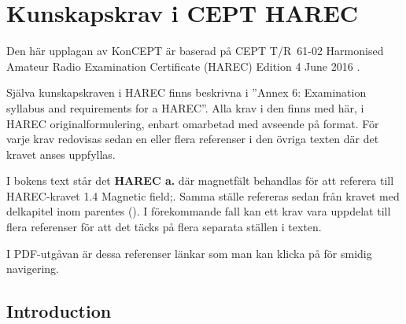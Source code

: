 \chapter{Kunskapskrav i CEPT HAREC}
\label{CEPT HAREC}

\noindent
Den här upplagan av KonCEPT är baserad på CEPT T/R~61-02 Harmonised Amateur
Radio Examination Certificate (HAREC) Edition 4 June 2016 \cite{TR6102}.

Själva kunskapskraven i HAREC finns beskrivna i
''Annex 6: Examination syllabus and requirements for a HAREC''.
Alla krav i den finns med här, i HAREC originalformulering, enbart omarbetad
med avseende på format.
För varje krav redovisas sedan en eller flera referenser i den övriga texten
där det kravet anses uppfyllas.

I bokens text står det \textbf{HAREC a.} där magnetfält
behandlas för att referera till HAREC-kravet 1.4 Magnetic field;.
Samma ställe refereras sedan från kravet med delkapitel inom parentes
().
I förekommande fall kan ett krav vara uppdelat till flera referenser för att
det täcks på flera separata ställen i texten.

I PDF-utgåvan är dessa referenser länkar som man kan klicka på för smidig
navigering.

\section{Introduction}

\makeatletter
\renewcommand{\theenumii}{\arabic{enumii}}
\renewcommand{\labelenumii}{\theenumi.\theenumii}
\renewcommand{\p@enumii}{\theenumi.}

\renewcommand{\theenumiii}{\arabic{enumiii}}
\renewcommand{\labelenumiii}{\theenumi.\theenumii.\theenumiii}
\renewcommand{\p@enumiii}{\theenumi.\theenumii.}
\makeatother

